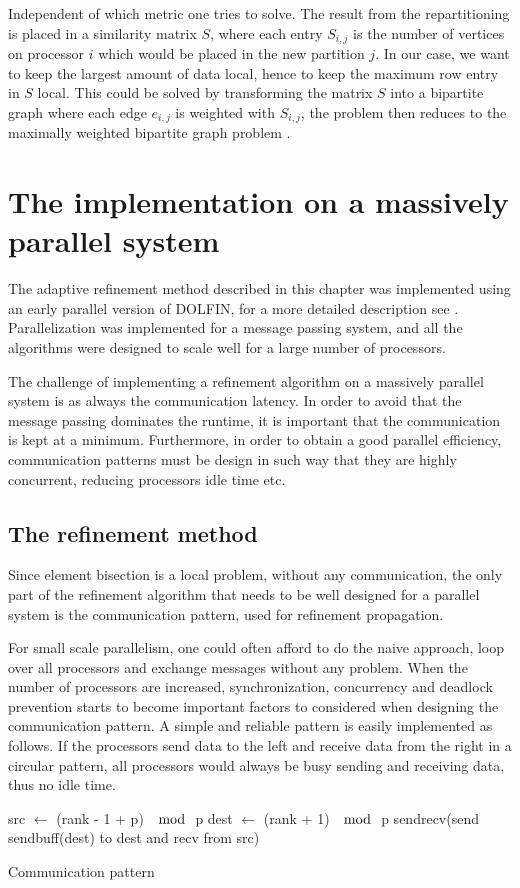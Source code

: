 Independent of which metric one tries to solve. The result from the
repartitioning is placed in a similarity matrix $S$, where each entry
$S_{i,j}$ is the number of vertices on processor $i$ which would be
placed in the new partition $j$. In our case, we want to keep the
largest amount of data local, hence to keep the maximum row entry in
$S$ local. This could be solved by transforming the matrix $S$ into a
bipartite graph where each edge $e_{i,j}$ is weighted with $S_{i,j}$,
the problem then reduces to the maximally weighted bipartite graph
problem \cite{Oliker1998}.

\section{The implementation on a massively parallel system}

The adaptive refinement method described in this chapter was
implemented using an early parallel version of DOLFIN, for a more
detailed description see \cite{Jansson2008}. Parallelization was
implemented for a message passing system, and all the algorithms were
designed to scale well for a large number of processors.

The challenge of implementing a refinement algorithm on a massively
parallel system is as always the communication latency. In order to
avoid that the message passing dominates the runtime, it is important
that the communication is kept at a minimum. Furthermore, in order to
obtain a good parallel efficiency, communication patterns must be
design in such way that they are highly concurrent, reducing
processors idle time etc.

\subsection{The refinement method}

Since element bisection is a local problem, without any communication,
the only part of the refinement algorithm that needs to be well designed
for a parallel system is the communication pattern, used for refinement
propagation.

For small scale parallelism, one could often afford to do the naive
approach, loop over all processors and exchange messages without any
problem. When the number of processors are increased, synchronization,
concurrency and deadlock prevention starts to become important factors
to considered when designing the communication pattern. A simple and
reliable pattern is easily implemented as follows. If the processors
send data to the left and receive data from the right in a circular
pattern, all processors would always be busy sending and receiving
data, thus no idle time.
\begin{algorithm}
  \begin{algorithmic}
    \State src $\leftarrow$ (rank - 1 + p) $\mod$ p
    \State dest $\leftarrow$ (rank + 1) $\mod$ p
    \State sendrecv(send sendbuff(dest) to dest and recv from src)
    \EndFor
  \end{algorithmic}
  \caption{Communication pattern}
  \label{hoffman-4:alg:cpattern}
\end{algorithm}

